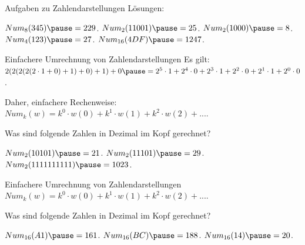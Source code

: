 \documentclass{beamer}
\begin{document}
\begin{frame}{Aufgaben zu Zahlendarstellungen}
	\pause Lösungen:
	\begin{itemize}
		\pitem $Num_8(345) \p = 229$.
		\pitem $Num_2(11001) \p = 25$.
		\pitem $Num_2(1000) \p = 8$.
		\pitem $Num_4(123) \p = 27$.
		\pitem $Num_{16}(4DF) \p = 1247$. 
	\end{itemize}
\end{frame}

\begin{frame}{Einfachere Umrechnung von Zahlendarstellungen}
	Es gilt: $2(2(2(2(2 \cdot 1 + 0)+1)+0)+1)+0 \p = 2^5 \cdot 1 + 2^4 \cdot 0 + 2^3 \cdot 1 + 2^2 \cdot 0 + 2^1 \cdot 1 + 2^0 \cdot 0$.
	
	\p Daher, einfachere Rechenweise: $Num_k(w) = k^0 \cdot w(0) + k^1 \cdot w(1) + k^2 \cdot w(2) + ...$.
	
	\p Was sind folgende Zahlen in Dezimal im Kopf gerechnet?
	
	\begin{itemize}
		\pitem $Num_2(10101) \p = 21$.
		\pitem $Num_2(11101) \p = 29$.
		\pitem $Num_2(1111111111) \p = 1023$.
	\end{itemize}
	
\end{frame}
		
\begin{frame}{Einfachere Umrechnung von Zahlendarstellungen}
	$Num_k(w) = k^0 \cdot w(0) + k^1 \cdot w(1) + k^2 \cdot w(2) + ...$.
	
	\p Was sind folgende Zahlen in Dezimal im Kopf gerechnet?
	
	\begin{itemize}
		\pitem $Num_{16}(A1) \p = 161$.
		\pitem $Num_{16}(BC) \p = 188$.
		\pitem $Num_{16}(14) \p = 20$.
	\end{itemize}
	
\end{frame}
\end{document}
